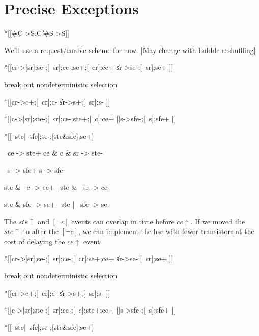 \documentclass{article}
\begin{document}
\section{Precise Exceptions}

\begin{csp}
*[[#C->S;C
  \|#S->S]]
\end{csp}

We'll use a request/enable scheme for now. [May change with bubble reshuffling]

\begin{hse}
*[[cr->[sr];se-;[~sr];ce-;se+;[~cr];ce+
  \|sr->se-;[~sr];se+
 ]]
\end{hse}

\noindent
break out nondeterministic selection

\begin{hse}
*[[cr->c+;[~cr];c-
  \|sr->s+;[~sr];s-
 ]]

*[[c->[sr];ste-;[~sr];ce-;ste+;[~c];ce+
  []s->sfe-;[~s];sfe+
 ]]

*[[~ste|~sfe];se-;[ste&sfe];se+]
\end{hse}

\begin{prs2}
~ce -> ste+
ce & c & sr -> ste-

~s -> sfe+
s -> sfe-
\end{prs2}

\begin{prs2}
ste & ~c -> ce+
~ste & ~sr -> ce-
\end{prs2}

\begin{prs2}
ste & sfe -> se+
~ste | ~sfe -> se-
\end{prs2}

\noindent
The $ste\uparrow$ and $[\neg c]$ events can overlap in time before $ce\uparrow$.
If we moved the $ste\uparrow$ to after the $[\neg c]$, 
we can implement the hse with fewer transistors at the cost of delaying the $ce\uparrow$ event.

\begin{hse}
*[[cr->[sr];se-;[~sr];ce-;[~cr];se+;ce+
  \|sr->se-;[~sr];se+
 ]]
\end{hse}

\noindent
break out nondeterministic selection

\begin{hse}
*[[cr->c+;[~cr];c-
  \|sr->s+;[~sr];s-
 ]]

*[[c->[sr];ste-;[~sr];ce-;[~c];ste+;ce+
  []s->sfe-;[~s];sfe+
 ]]

*[[~ste|~sfe];se-;[ste&sfe];se+]
\end{hse}
\end{document}

